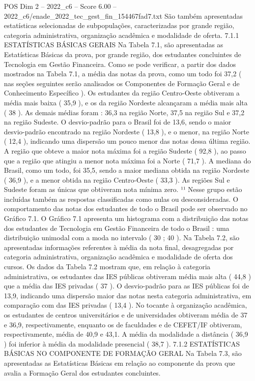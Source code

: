 \begin{textsample}{POS Dim 2 – 2022\_c6 – Score 6.00 – 2022\_c6/enade\_2022\_tec\_gest\_fin\_154467fad7.txt}
São também apresentadas estatísticas selecionadas de subpopulações, caracterizadas por grande região, categoria administrativa, organização acadêmica e modalidade de oferta. 7.1.1 ESTATÍSTICAS BÁSICAS GERAIS Na Tabela 7.1, são apresentadas as Estatísticas Básicas da prova, por grande região, dos estudantes concluintes de Tecnologia em Gestão Financeira.
Como se pode verificar, a partir dos dados mostrados na Tabela 7.1, a média das notas da prova, como um todo foi 37,2 ( nas seções seguintes serão analisados os Componentes de Formação Geral e de Conhecimento Específico ).
Os estudantes da região Centro-Oeste obtiveram a média mais baixa ( 35,9 ), e os da região Nordeste alcançaram a média mais alta ( 38 ).
As demais médias foram : 36,3 na região Norte, 37,5 na região Sul e 37,2 na região Sudeste.
O desvio-padrão para o Brasil foi de 13,6, sendo o maior desvio-padrão encontrado na região Nordeste ( 13,8 ), e o menor, na região Norte ( 12,4 ), indicando uma dispersão um pouco menor das notas dessa última região.
A região que obteve a maior nota máxima foi a região Sudeste ( 92,8 ), ao passo que a região que atingiu a menor nota máxima foi a Norte ( 71,7 ).
A mediana do Brasil, como um todo, foi 35,5, sendo a maior mediana obtida na região Nordeste ( 36,9 ), e a menor obtida na região Centro-Oeste ( 33,3 ).
As regiões Sul e Sudeste foram as únicas que obtiveram nota mínima zero. ¹¹ Nesse grupo estão incluídas também as respostas classificadas como nulas ou desconsideradas.
O comportamento das notas dos estudantes de todo o Brasil pode ser observado no Gráfico 7.1.
O Gráfico 7.1 apresenta um histograma com a distribuição das notas dos estudantes de Tecnologia em Gestão Financeira de todo o Brasil : uma distribuição unimodal com a moda no intervalo ( 30 ; 40 ).
Na Tabela 7.2, são apresentadas informações referentes à média da nota final, desagregadas por categoria administrativa, organização acadêmica e modalidade de oferta dos cursos.
Os dados da Tabela 7.2 mostram que, em relação à categoria administrativa, os estudantes das IES públicas obtiveram média mais alta ( 44,8 ) que a média das IES privadas ( 37 ).
O desvio-padrão para as IES públicas foi de 13,9, indicando uma dispersão maior das notas nesta categoria administrativa, em comparação com das IES privadas ( 13,4 ).
No tocante à organização acadêmica, os estudantes de centros universitários e de universidades obtiveram média de 37 e 36,9, respectivamente, enquanto os de faculdades e de CEFET/IF obtiveram, respectivamente, média de 40,9 e 43,1.
A média da modalidade a distância ( 36,9 ) foi inferior à média da modalidade presencial ( 38,7 ). 7.1.2 ESTATÍSTICAS BÁSICAS NO COMPONENTE DE FORMAÇÃO GERAL Na Tabela 7.3, são apresentadas as Estatísticas Básicas em relação ao componente da prova que avalia a Formação Geral dos estudantes concluintes.

\end{textsample}
